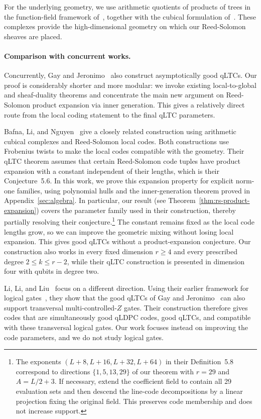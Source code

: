 \documentclass[11pt,letterpaper]{article}
\renewcommand{\le}{\leqslant}
\renewcommand{\ge}{\geqslant}
\theoremstyle{definition}
\theoremstyle{remark}
\begin{document}
For the underlying geometry, we use arithmetic quotients of products
of trees in the function-field framework of~\cite{RSV2019}, together
with the cubical formulation of~\cite{HLMRZ2025}.  These complexes
provide the high-dimensional geometry on which our Reed-Solomon
sheaves are placed.

\paragraph{Comparison with concurrent works.}

Concurrently, Gay and Jeronimo~\cite{GayJeronimo2026} also construct
asymptotically good qLTCs.  Our proof is considerably shorter and more
modular: we invoke
existing local-to-global and sheaf-duality theorems and concentrate the
main new argument on Reed-Solomon product expansion via
inner generation.  This gives a relatively direct route from the local
coding statement to the final qLTC parameters.


Bafna, Li, and Nguyen~\cite{BafnaLiNguyen2026} give a closely
related construction using arithmetic cubical complexes
and Reed-Solomon local codes.
Both constructions use Frobenius twists to make the local
codes compatible with the geometry.
Their qLTC theorem assumes that certain Reed-Solomon code
tuples have product expansion with a constant independent
of their lengths, which is their Conjecture~5.6. In this work, we prove this expansion property for explicit norm-one
families, using polynomial hulls and the inner-generation
theorem proved in Appendix~\ref{sec:algebra}.
In particular, our result (see Theorem~\ref{thm:rs-product-expansion})
covers the parameter family used in their construction,
thereby partially resolving their conjecture.\footnote{
The exponents $(L+8,L+16,L+32,L+64)$ in their
Definition~5.8 correspond to directions $\{1,5,13,29\}$
of our theorem with $r=29$ and $A=L/2+3$.
If necessary, extend the coefficient field to contain all
29 evaluation sets and then descend the line-code
decompositions by a linear projection fixing the original
field.
This preserves code membership and does not increase
support.
}
The constant remains fixed as the local code lengths grow,
so we can improve the geometric mixing without losing
local expansion.
This gives good qLTCs without a product-expansion conjecture.
Our construction also works in every fixed dimension
$r\ge4$ and every prescribed degree $2\le k\le r-2$,
while their qLTC construction is presented in dimension
four with qubits in degree two.

Li, Li, and Liu~\cite{LiLiLiu2026} focus on a different direction. Using their earlier framework for logical gates~\cite{TransversalGatesOnAlmostGoodQuantumCodes}, they show that the good qLTCs of Gay and Jeronimo~\cite{GayJeronimo2026} can also support transversal multi-controlled-$Z$ gates. Their construction therefore gives codes that are simultaneously good qLDPC codes, good qLTCs, and compatible with these transversal logical gates. Our work focuses instead on improving the code parameters, and we do not study logical gates.
\end{document}
